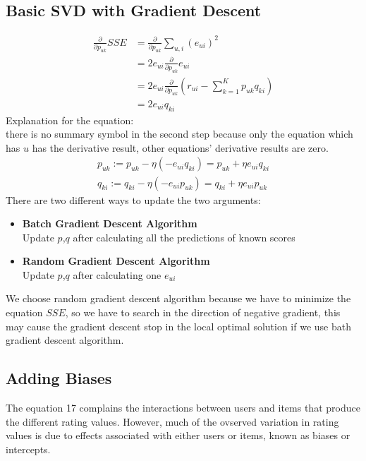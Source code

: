 \documentclass[a4paper, 12pt]{article}
\theoremstyle{definition}
\begin{document}
\subsection{Basic SVD with Gradient Descent}
\begin{equation}
\begin{split}
\frac{\partial }{\partial p_{uk}}SSE&=\frac{\partial}{\partial p_{uk}}\sum_{u,i}(e_{ui})^{2}\\
&=2e_{ui}\frac{\partial}{\partial p_{uk}}e_{ui}\\
&=2e_{ui}\frac{\partial}{\partial p_{uk}}(r_{ui}-\sum_{k=1}^{K}p_{uk}q_{ki})\\
&=2e_{ui}q_{ki}
\end{split}
\end{equation}
Explanation for the equation:\\
there is no summary symbol in the second step because only the equation which has $u$ has the derivative result,  other equations' derivative results are zero.
\begin{equation}
\begin{split}
p_{uk}:=p_{uk}-\eta(-e_{ui}q_{ki})=p_{uk}+\eta e_{ui}q_{ki}\\
q_{ki}:=q_{ki}-\eta(-e_{ui}p_{uk})=q_{ki}+\eta e_{ui}p_{uk}
\end{split}
\end{equation}
There are two different ways to update the two arguments:
\begin{itemize}
	\item \textbf{Batch Gradient Descent Algorithm}\\
	Update $p$,$q$ after calculating all the predictions of known scores
	\item \textbf{Random Gradient Descent Algorithm}\\
	Update $p$,$q$ after calculating one $e_{ui}$	
\end{itemize}
We choose random gradient descent algorithm because we have to minimize the equation $SSE$,  so we have to search in the direction of negative gradient, this may cause the gradient descent stop in the local optimal solution if we use bath gradient descent algorithm. 
\subsection{Adding Biases}
The equation 17 complains the interactions between users and items that produce the different rating values. However, much of the ovserved variation in rating values is due to effects associated with either users or items, known as biases or intercepts.
\end{document}

